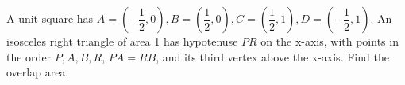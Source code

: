 A unit square has $A=(-\dfrac{1}{2},0),B=(\dfrac{1}{2},0),C=(\dfrac{1}{2},1),D=(-\dfrac{1}{2},1)$. An isosceles right triangle of area 1 has hypotenuse $PR$ on the x-axis, with points in the order $P,A,B,R$, $PA=RB$, and its third vertex above the x-axis. Find the overlap area.
